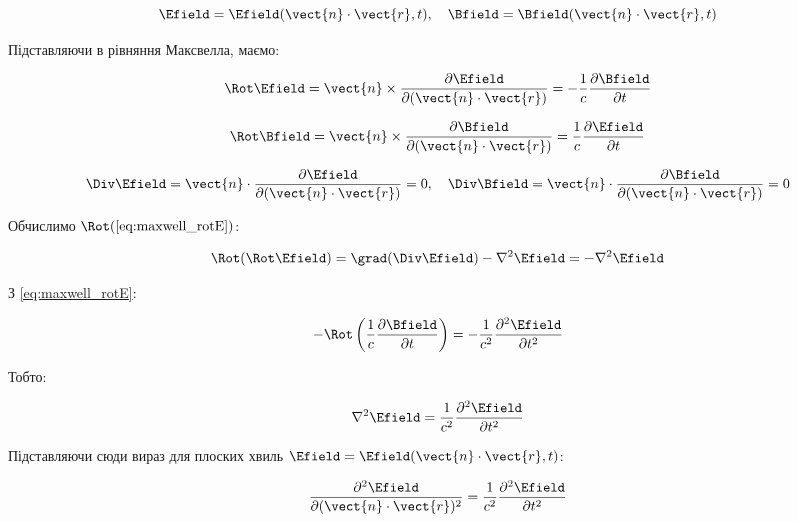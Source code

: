 \begin{equation*}
\Efield = \Efield(\vect{n} \cdot \vect{r}, t), \quad \Bfield = \Bfield(\vect{n} \cdot \vect{r}, t)
\end{equation*}

Підставляючи в рівняння Максвелла, маємо:

\begin{equation}
\Rot\Efield = \vect{n} \times \frac{\partial \Efield}{\partial (\vect{n} \cdot \vect{r})} = -\frac{1}{c} \frac{\partial \Bfield}{\partial t}
\label{eq:maxwell_rotE}
\end{equation}

\begin{equation}
\Rot\Bfield = \vect{n} \times \frac{\partial \Bfield}{\partial (\vect{n} \cdot \vect{r})} = \frac{1}{c} \frac{\partial \Efield}{\partial t}
\label{eq:maxwell_rotB}
\end{equation}

\begin{equation}
\Div\Efield = \vect{n} \cdot \frac{\partial \Efield}{\partial (\vect{n} \cdot \vect{r})} = 0, \quad \Div\Bfield = \vect{n} \cdot
\frac{\partial \Bfield}{\partial (\vect{n} \cdot \vect{r})} = 0
\label{eq:maxwell_div}
\end{equation}

Обчислимо \(\Rot(\eqref{eq:maxwell_rotE})\):

\begin{equation*}
\Rot(\Rot\Efield) = \grad (\Div\Efield) - \nabla^2 \Efield = -\nabla^2 \Efield
\end{equation*}

З \eqref{eq:maxwell_rotE}:

\begin{equation*}
-\Rot\left( \frac{1}{c} \frac{\partial \Bfield}{\partial t} \right) = -\frac{1}{c^2} \frac{\partial^2 \Efield}{\partial t^2}
\end{equation*}

Тобто:

\begin{equation}
\nabla^2 \Efield = \frac{1}{c^2} \frac{\partial^2 \Efield}{\partial t^2}
\label{eq:wave_equation_E}
\end{equation}

Підставляючи сюди вираз для плоских хвиль \(\Efield = \Efield(\vect{n} \cdot \vect{r}, t)\):

\begin{equation*}
\frac{\partial^2 \Efield}{\partial (\vect{n} \cdot \vect{r})^2} = \frac{1}{c^2} \frac{\partial^2 \Efield}{\partial t^2}
\end{equation*}

